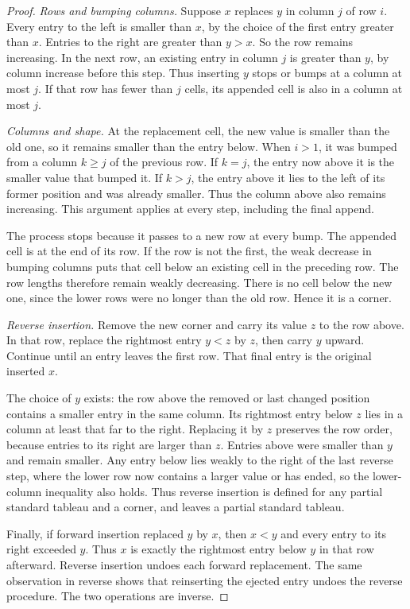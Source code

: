 \begin{proof}
\emph{Rows and bumping columns.}
Suppose $x$ replaces $y$ in column $j$ of row $i$. Every entry to the left is smaller than $x$, by the choice of the first entry greater than $x$. Entries to the right are greater than $y>x$. So the row remains increasing. In the next row, an existing entry in column $j$ is greater than $y$, by column increase before this step. Thus inserting $y$ stops or bumps at a column at most $j$. If that row has fewer than $j$ cells, its appended cell is also in a column at most $j$.

\emph{Columns and shape.}
At the replacement cell, the new value is smaller than the old one, so it remains smaller than the entry below. When $i>1$, it was bumped from a column $k\ge j$ of the previous row. If $k=j$, the entry now above it is the smaller value that bumped it. If $k>j$, the entry above it lies to the left of its former position and was already smaller. Thus the column above also remains increasing. This argument applies at every step, including the final append.

The process stops because it passes to a new row at every bump. The appended cell is at the end of its row. If the row is not the first, the weak decrease in bumping columns puts that cell below an existing cell in the preceding row. The row lengths therefore remain weakly decreasing. There is no cell below the new one, since the lower rows were no longer than the old row. Hence it is a corner.

\emph{Reverse insertion.}
Remove the new corner and carry its value $z$ to the row above. In that row, replace the rightmost entry $y<z$ by $z$, then carry $y$ upward. Continue until an entry leaves the first row. That final entry is the original inserted $x$.

The choice of $y$ exists: the row above the removed or last changed position contains a smaller entry in the same column. Its rightmost entry below $z$ lies in a column at least that far to the right. Replacing it by $z$ preserves the row order, because entries to its right are larger than $z$. Entries above were smaller than $y$ and remain smaller. Any entry below lies weakly to the right of the last reverse step, where the lower row now contains a larger value or has ended, so the lower-column inequality also holds. Thus reverse insertion is defined for any partial standard tableau and a corner, and leaves a partial standard tableau.

Finally, if forward insertion replaced $y$ by $x$, then $x<y$ and every entry to its right exceeded $y$. Thus $x$ is exactly the rightmost entry below $y$ in that row afterward. Reverse insertion undoes each forward replacement. The same observation in reverse shows that reinserting the ejected entry undoes the reverse procedure. The two operations are inverse.
\end{proof}

